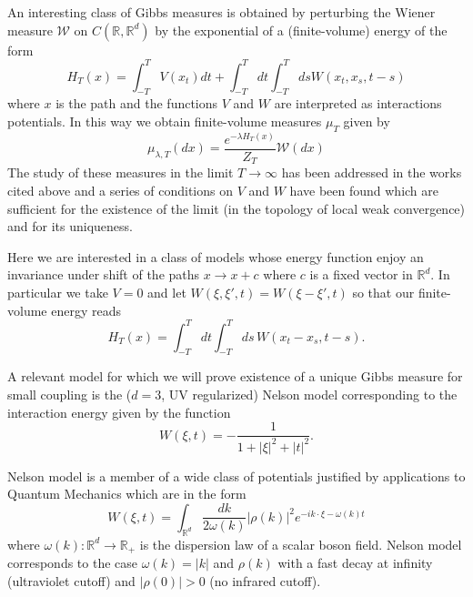 \documentclass[a4paper,12pt,reqno]{amsart}
\newcommand{\R}{\mathbb{R}}
\newcommand{\W}{\mathcal{W}}
\begin{document}
An interesting class of Gibbs measures is obtained by
perturbing the Wiener measure $\W$ on $C(\R,\R^d)$ by the exponential
of a (finite-volume)  energy of the form
$$
H_T(x) = \int_{-T}^T V(x_t) dt + \int_{-T}^T dt \int_{-T}^T ds W(x_t,x_s,t-s)
$$
where $x$ is the path and the functions $V$ and $W$ are 
interpreted as interactions potentials. In this way we obtain
finite-volume measures $\mu_T$ given by
\begin{equation}
 \mu_{\lambda,T}(dx) = \frac{e^{-\lambda H_T(x)}}{Z_T} \W(dx) 
\end{equation}
The study of these measures in the limit $T \to \infty$ has been
addressed in the works cited above and a series of conditions on $V$
and $W$ have been found which are sufficient for the existence of the
limit (in the topology of local weak convergence) and for its
uniqueness.  

Here we are interested in a class of models whose energy function enjoy
an invariance under shift of the paths $x \to x + c$ where $c$ is a
fixed vector in $\R^d$. In particular we take $V = 0$ and let
$W(\xi,\xi',t) = W(\xi-\xi',t)$ so that our finite-volume energy reads
$$
H_T(x) =  \int_{-T}^T dt \int_{-T}^T ds\, W(x_t-x_s,t-s).
$$


A relevant model for which we will prove existence of a unique Gibbs measure for small coupling is the ($d=3$, UV regularized) Nelson model
corresponding to the interaction energy given by the function
\begin{equation}
  \label{eq:nelson-3d}
W(\xi,t) = -\frac{1}{1+|\xi|^2+|t|^2}.  
\end{equation}

Nelson model is a member of a wide class of potentials justified by applications to Quantum Mechanics  which are in the form
\begin{equation}
  \label{eq:spectral}
W(\xi,t)  = \int_{\R^d} \frac{dk}{2\omega(k)} |\rho(k)|^2 e^{- i k\cdot \xi - \omega(k) t}
\end{equation}
where $\omega(k) : \R^d \to \R_+$ is the dispersion law of a scalar boson field. Nelson model corresponds to the case $\omega(k) = |k|$ and $\rho(k)$ with a fast decay at infinity (ultraviolet  cutoff) and $|\rho(0)| > 0$ (no infrared cutoff).
\end{document}
